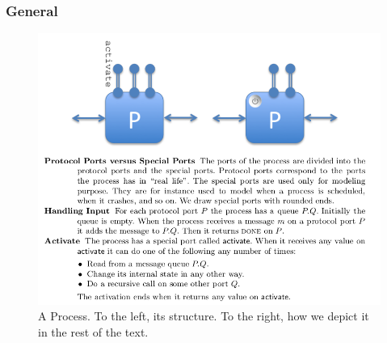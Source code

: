 \documentclass[11pt]{article}
\begin{document}
\subsubsection{General}
\label{sec:orga54da25}
\begin{figure}[htbp]
\centering
\includegraphics[width=.9\linewidth]{A Syntax for Distributed Systems (3)/screenshot_2018-09-02_11-20-12.png}
\caption{\label{fig:org409bc0a}
A Process. To the left, its structure. To the right, how we depict it in the rest of the text.}
\end{figure}
\end{document}
